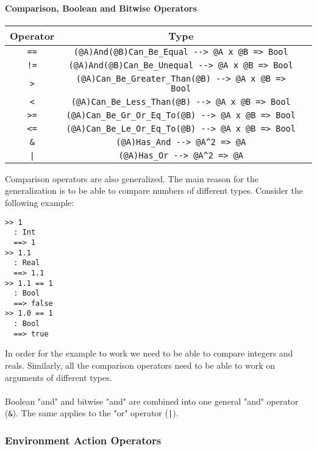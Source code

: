 \documentclass{article}
\begin{document}
\paragraph{Comparison, Boolean and Bitwise Operators}

\begin{center}
\begin{tabular}{ |c|c|c| }
\hline
Operator & Type
\\
\hline
\hline
\verb|==| & \verb|(@A)And(@B)Can_Be_Equal --> @A x @B => Bool|
\\
\hline
\verb|!=| & \verb|(@A)And(@B)Can_Be_Unequal --> @A x @B => Bool|
\\
\hline
\verb|>| & \verb|(@A)Can_Be_Greater_Than(@B) --> @A x @B => Bool|
\\
\hline
\verb|<| & \verb|(@A)Can_Be_Less_Than(@B) --> @A x @B => Bool|
\\
\hline
\verb|>=| & \verb|(@A)Can_Be_Gr_Or_Eq_To(@B) --> @A x @B => Bool|
\\
\hline
\verb|<=| & \verb|(@A)Can_Be_Le_Or_Eq_To(@B) --> @A x @B => Bool|
\\
\hline
\verb|&| & \verb|(@A)Has_And --> @A^2 => @A|
\\
\hline
\texttt{|} & \verb|(@A)Has_Or --> @A^2 => @A|
\\
\hline
\end{tabular}
\end{center}
Comparison operators are also generalized. The main reason for the
generalization is to be able to compare numbers of different types. Consider
the following example:

\begin{verbatim}
>> 1
  : Int
  ==> 1
>> 1.1
  : Real
  ==> 1.1
>> 1.1 == 1
  : Bool
  ==> false
>> 1.0 == 1
  : Bool
  ==> true
\end{verbatim}
In order for the example to work we need to be able to compare integers and
reals.  Similarly, all the comparison operators need to be able to work on
arguments of different types.
\\\\
Boolean "and" and bitwise "and" are combined into one general "and" operator
(\verb|&|). The same applies to the "or" operator (\texttt{|}).

\newpage

\subsubsection{Environment Action Operators}
\label{subsec:envacts}
\end{document}
